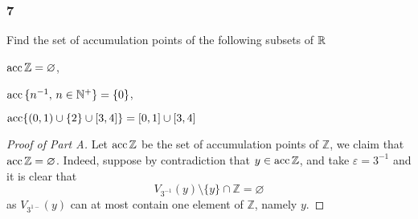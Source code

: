 \documentclass[../main.tex]{subfiles}
\begin{document}
\subsubsection*{7}
\begin{wts}
    Find the set of accumulation points of the following subsets of $\mathbb{R}$
    \begin{enumalpha}
        \item $\operatorname{acc}{\mathbb{Z}}=\varnothing$,
        \item $\operatorname{acc}{\{n^{-1},\,n\in\mathbb{N}^+\}}=\{0\}$,
        \item $\operatorname{acc}\{(0,1)\cup\{2\}\cup[3,4]\}=[0,1]\cup[3,4]$
    \end{enumalpha}
\end{wts}

\begin{proof}[Proof of Part A]
    Let $\operatorname{acc}{\mathbb{Z}}$ be the set of accumulation points of $\mathbb{Z}$, we claim that $\operatorname{acc}{\mathbb{Z}}=\varnothing$. Indeed, suppose by contradiction that $y\in\operatorname{acc}{\mathbb{Z}}$, and take $\varepsilon=3^{-1}$ and it is clear that\[V_{3^{-1}}(y)\setminus\{y\}\cap\mathbb{Z}=\varnothing\] as $V_{3^{1-}}(y)$ can at most contain one element of $\mathbb{Z}$, namely $y$.
\end{proof}
\end{document}
